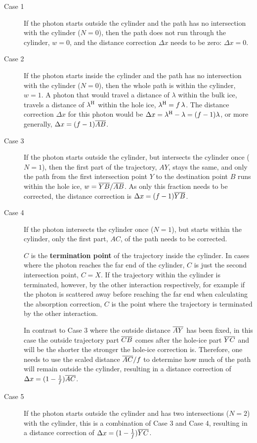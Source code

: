 \begin{description}
  \item[Case 1] If the photon starts outside the cylinder and the path has no intersection with the cylinder ($N = 0$), then the path does not run through the cylinder, $w = 0$, and the distance correction $\Delta x$ needs to be zero: $\Delta x = 0$.
  \item[Case 2] If the photon starts inside the cylinder and the path has no intersection with the cylinder ($N = 0$), then the whole path is within the cylinder, $w = 1$. A photon that would travel a distance of $\lambda$ within the bulk ice, travels a distance of $\lambda^\text{H}$ within the hole ice, $\lambda^\text{H} = f\,\lambda$. The distance correction $\Delta x$ for this photon would be $\Delta x = \lambda^\text{H} - \lambda = (f - 1)\lambda$, or more generally, $\Delta x = (f - 1) \overline{AB}$.
  \item[Case 3] If the photon starts outside the cylinder, but intersects the cylinder once ($N = 1$), then the first part of the trajectory, $AY$, stays the same, and only the path from the first intersection point $Y$ to the destination point $B$ runs within the hole ice, $w = \overline{YB} / \overline{AB}$. As only this fraction needs to be corrected, the distance correction is $\Delta x = (f - 1)\overline{YB}$.
  \item[Case 4] If the photon intersects the cylinder once ($N = 1$), but starts within the cylinder, only the first part, $AC$, of the path needs to be corrected.

  $C$ is the \textbf{termination point} of the trajectory inside the cylinder. In cases where the photon reaches the far end of the cylinder, $C$ is just the second intersection point, $C = X$. If the trajectory within the cylinder is terminated, however, by the other interaction respectively, for example if the photon is scattered away before reaching the far end when calculating the absorption correction, $C$ is the point where the trajectory is terminated by the other interaction.

  In contrast to Case 3 where the outside distance $\overline{AY}$ has been fixed, in this case the outside trajectory part $\overline{CB}$ comes after the hole-ice part $\overline{YC}$ and will be the shorter the stronger the hole-ice correction is. Therefore, one needs to use the scaled distance $\overline{AC} / f$ to determine how much of the path will remain outside the cylinder, resulting in a distance correction of $\Delta x = (1 - \frac{1}{f})\overline{AC}$.
  \item[Case 5] If the photon starts outside the cylinder and has two intersections ($N = 2$) with the cylinder, this is a combination of Case 3 and Case 4, resulting in a distance correction of $\Delta x = (1 - \frac{1}{f})\overline{YC}$.
\end{description}

